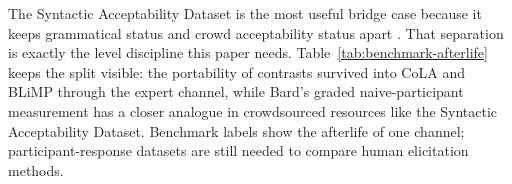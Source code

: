 The Syntactic Acceptability Dataset is the most useful bridge case because it
keeps grammatical status and crowd acceptability status apart
\citep{juzek2024}. That separation is exactly the level discipline this
paper needs. Table~\ref{tab:benchmark-afterlife} keeps the split visible: the
portability of contrasts survived into CoLA and BLiMP through the expert
channel, while Bard's graded naive-participant measurement has a closer analogue
in crowdsourced resources like the Syntactic Acceptability Dataset. Benchmark
labels show the afterlife of one channel; participant-response datasets are
still needed to compare human elicitation methods.
